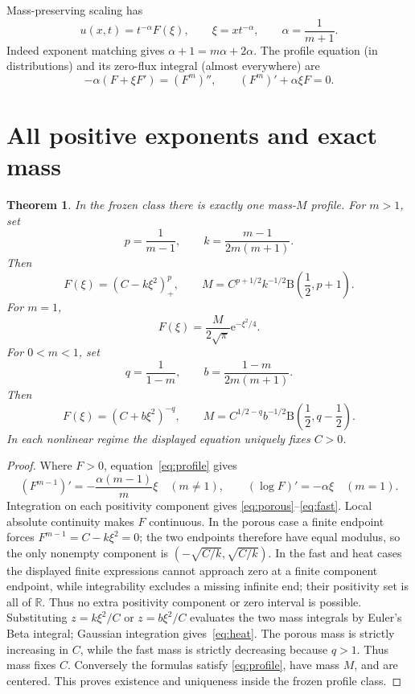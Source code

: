 \documentclass[9pt]{extarticle}
\newtheorem{theorem}{Theorem}
\newcommand{\R}{\mathbb R}
\newcommand{\e}{\mathrm e}
\newcommand{\B}{\mathrm B}
\begin{document}
Mass-preserving scaling has
\[
 u(x,t)=t^{-\alpha}F(\xi),\qquad \xi=xt^{-\alpha},\qquad
 \alpha=\frac1{m+1}.
\]
Indeed exponent matching gives $\alpha+1=m\alpha+2\alpha$.
The profile equation (in distributions) and its zero-flux integral (almost
everywhere) are
\begin{equation}\label{eq:profile}
 -\alpha(F+\xi F')=(F^m)'',\qquad
 (F^m)'+\alpha\xi F=0.
\end{equation}

\section{All positive exponents and exact mass}
\begin{theorem}\label{thm:atlas}
In the frozen class there is exactly one mass-$M$ profile.  For $m>1$, set
\[
 p=\frac1{m-1},\qquad k=\frac{m-1}{2m(m+1)}.
\]
Then
\begin{equation}\label{eq:porous}
 F(\xi)=(C-k\xi^2)_+^p,\qquad
 M=C^{p+1/2}k^{-1/2}\B\!\left(\frac12,p+1\right).
\end{equation}
For $m=1$,
\begin{equation}\label{eq:heat}
 F(\xi)=\frac{M}{2\sqrt\pi}\e^{-\xi^2/4}.
\end{equation}
For $0<m<1$, set
\[
 q=\frac1{1-m},\qquad b=\frac{1-m}{2m(m+1)}.
\]
Then
\begin{equation}\label{eq:fast}
 F(\xi)=(C+b\xi^2)^{-q},\qquad
 M=C^{1/2-q}b^{-1/2}\B\!\left(\frac12,q-\frac12\right).
\end{equation}
In each nonlinear regime the displayed equation uniquely fixes $C>0$.
\end{theorem}
\begin{proof}
Where $F>0$, equation~\eqref{eq:profile} gives
\[
 (F^{m-1})'=-\frac{\alpha(m-1)}m\xi \quad(m\ne1),
 \qquad (\log F)'=-\alpha\xi \quad(m=1).
\]
Integration on each positivity component gives
\eqref{eq:porous}--\eqref{eq:fast}.  Local absolute continuity makes $F$
continuous.  In the porous case a finite endpoint forces
$F^{m-1}=C-k\xi^2=0$; the two endpoints therefore have equal modulus, so the
only nonempty component is $(-\sqrt{C/k},\sqrt{C/k})$.  In the fast and heat
cases the displayed finite expressions cannot approach zero at a finite
component endpoint, while integrability excludes a missing infinite end;
their positivity set is all of $\R$.  Thus no extra positivity component or
zero interval is possible.  Substituting $z=k\xi^2/C$ or
$z=b\xi^2/C$ evaluates the two mass integrals by Euler's Beta integral;
Gaussian integration gives~\eqref{eq:heat}.  The porous mass is strictly
increasing in $C$, while the fast mass is strictly decreasing because
$q>1$.  Thus mass fixes $C$.  Conversely the formulas satisfy
\eqref{eq:profile}, have mass $M$, and are centered.  This proves existence
and uniqueness inside the frozen profile class.
\end{proof}
\end{document}
